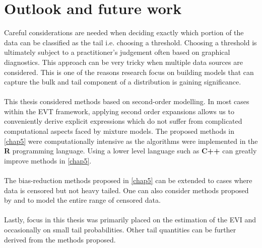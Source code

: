 \section{Outlook and future work}
Careful considerations are needed when deciding exactly which portion of the data can be classified as the tail i.e. choosing a threshold. Choosing a threshold is ultimately subject to a practitioner's judgement often based on graphical diagnostics. This approach can be very tricky when multiple data sources are considered. This is one of the reasons research focus on building models that can capture the bulk and tail component of a distribution is gaining significance.
\\\\
This thesis considered methods based on second-order modelling. In most cases within the EVT framework, applying second order expansions allows us to conveniently derive explicit expressions which do not suffer from complicated computational aspects faced by mixture models. The proposed methods in \autoref{chap5} were computationally intensive as the algorithms were implemented in the \textbf{R} programming language. Using a lower level language such as \textbf{C++} can greatly improve methods in \autoref{chap5}.
\\\\
The bias-reduction methods proposed in \autoref{chap5} can be extended to cases where data is censored but not heavy tailed. One can also consider methods proposed by \cite{naveau2016modeling} and \cite{tencaliec2018flexible} to model the entire range of censored data.
\\\\
Lastly, focus in this thesis was primarily placed on the estimation of the EVI and occasionally on small tail probabilities. Other tail quantities can be further derived from the methods proposed.